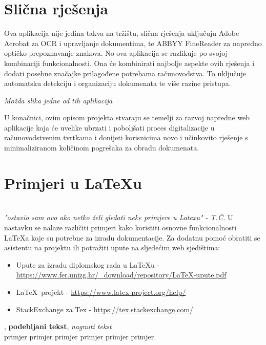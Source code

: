 		\section{Slična rješenja}
		Ova aplikacija nije jedina takva na tržištu, slična rješenja uključuju Adobe Acrobat za OCR i upravljanje dokumentima, te ABBYY FineReader za napredno optičko prepoznavanje znakova. No ova aplikacija se razlikuje po svojoj kombinaciji funkcionalnosti. Ona će kombinirati najbolje aspekte ovih rješenja i dodati posebne značajke prilagođene potrebama računovodstva. To uključuje automatsku detekciju i organizaciju dokumenata te više razine pristupa.

		\textit{Možda slika jedne od tih aplikacija}

		U konačnici, ovim opisom projekta stvaraju se temelji za razvoj napredne web aplikacije koja će uvelike ubrzati i poboljšati proces digitalizacije u računovodstvenim tvrtkama i donijeti korisnicima novo i učinkovito rješenje s minimaliziranom količinom pogrešaka za obradu dokumenata.
		\eject
		
		\section{Primjeri u \LaTeX u}
		
		\\
		\textit{"ostavio sam ovo ako netko želi gledati neke primjere u Latexu" - T.Č.}
		U nastavku se nalaze različiti primjeri kako koristiti osnovne funkcionalnosti \LaTeX a koje su potrebne za izradu dokumentacije. Za dodatnu pomoć obratiti se asistentu na projektu ili potražiti upute na sljedećim web sjedištima:
		\begin{itemize}
			\item Upute za izradu diplomskog rada u \LaTeX u - \url{https://www.fer.unizg.hr/_download/repository/LaTeX-upute.pdf}
			\item \LaTeX\ projekt - \url{https://www.latex-project.org/help/}
			\item StackExchange za Tex - \url{https://tex.stackexchange.com/}\\
		
		\end{itemize} 	


		
		\noindent {}, \textbf{podebljani tekst}, 	\textit{nagnuti tekst}\\
		\noindent \normalsize primjer \large primjer \Large primjer \LARGE {primjer} \huge {primjer} \Huge primjer \normalsize
				
